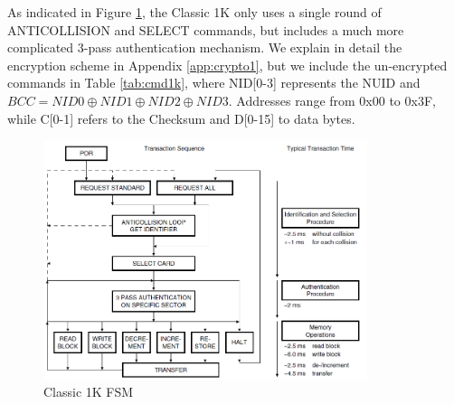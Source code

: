 \documentclass[fleqn,10pt]{SelfArx} %
\begin{document}
\noindent As indicated in Figure \ref{fig:fsm1k}, the Classic 1K only uses a single round of ANTICOLLISION and SELECT commands, but includes a much more complicated 3-pass authentication mechanism. We explain in detail the encryption scheme in Appendix \ref{app:crypto1}, but we include the un-encrypted commands in Table \ref{tab:cmd1k}, where NID[0-3] represents the NUID and $BCC=NID0 \oplus NID1 \oplus NID2 \oplus NID3$. Addresses range from 0x00 to 0x3F, while C[0-1] refers to the Checksum and D[0-15] to data bytes.

\begin{figure}[ht]
 \hfill
  \includegraphics[height=7cm,keepaspectratio]{img/fsm1k}
 \hspace*{\fill}
  \caption{Classic 1K FSM}
  \label{fig:fsm1k}
\end{figure}
\end{document}
